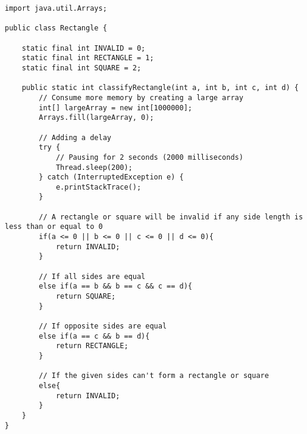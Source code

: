 \begin{lstlisting}
import java.util.Arrays;

public class Rectangle {
    
    static final int INVALID = 0;
    static final int RECTANGLE = 1;
    static final int SQUARE = 2;

    public static int classifyRectangle(int a, int b, int c, int d) {
        // Consume more memory by creating a large array
        int[] largeArray = new int[1000000];
        Arrays.fill(largeArray, 0);
        
        // Adding a delay
        try {
            // Pausing for 2 seconds (2000 milliseconds)
            Thread.sleep(200);
        } catch (InterruptedException e) {
            e.printStackTrace();
        }

        // A rectangle or square will be invalid if any side length is less than or equal to 0
        if(a <= 0 || b <= 0 || c <= 0 || d <= 0){
            return INVALID;
        }

        // If all sides are equal
        else if(a == b && b == c && c == d){
            return SQUARE;
        }

        // If opposite sides are equal
        else if(a == c && b == d){
            return RECTANGLE;
        }

        // If the given sides can't form a rectangle or square
        else{
            return INVALID;
        }
    }
}
\end{lstlisting}